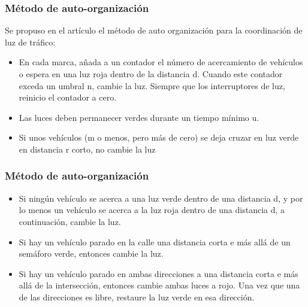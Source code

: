 \documentclass{beamer}
\begin{document}
\begin{frame}
	\frametitle{Método de auto-organización}
	
	Se propuso en el artículo el método de auto organización para la coordinación de luz de tráfico:\\
	\begin{itemize}
		\justifying 
		\item En cada marca, añada a un contador el número de acercamiento de vehículos o espera en una luz roja dentro de la distancia d. Cuando este contador exceda un umbral n, cambie la luz. Siempre que los interruptores de luz, reinicio el contador a cero.
		\item Las luces deben permanecer verdes durante un tiempo mínimo u.
		\item Si unos vehículos (m o menos, pero más de cero) se deja cruzar en luz verde en distancia r corto, no cambie la luz
	\end{itemize}
	
	
	
\end{frame}
\begin{frame}
	\frametitle{Método de auto-organización}
	
	
	\begin{itemize}
		\justifying 
		\item Si ningún vehículo se acerca a una luz verde dentro de una distancia d, y por lo menos un vehículo se acerca a la luz roja dentro de una distancia d, a continuación, cambie la luz.
		\item Si hay un vehículo parado en la calle una distancia corta e más allá de un semáforo verde, entonces cambie la luz. 
		\item Si hay un vehículo parado en ambas direcciones a una distancia corta e más allá de la intersección, entonces cambie ambas luces a rojo. Una vez que una de las direcciones es libre, restaure la luz verde en esa dirección. 
	\end{itemize}
\end{frame}
\end{document}
